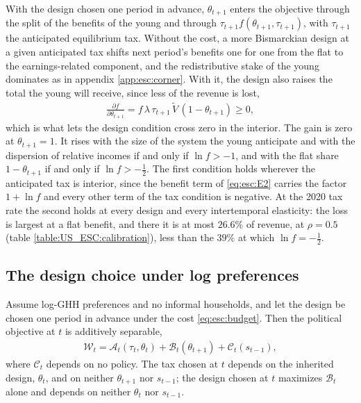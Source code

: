  With the design chosen one period in advance, $\theta_{t+1}$ enters the objective through the split of the benefits of the young and through $\tau_{t+1}f(\theta_{t+1},\tau_{t+1})$, with $\tau_{t+1}$ the anticipated equilibrium tax. Without the cost, a more Bismarckian design at a given anticipated tax shifts next period's benefits one for one from the flat to the earnings-related component, and the redistributive stake of the young dominates as in appendix \ref{app:esc:corner}. With it, the design also raises the total the young will receive, since less of the revenue is lost,
\begin{align}\label{eq:esc:ftheta}
    \frac{\partial f}{\partial \theta_{t+1}} = f\,\lambda\,\tau_{t+1}\,\tilde{V}\,(1-\theta_{t+1}) \geq 0,
\end{align}
which is what lets the design condition cross zero in the interior. The gain is zero at $\theta_{t+1} = 1$. It rises with the size of the system the young anticipate and with the dispersion of relative incomes if and only if $\ln f > -1$, and with the flat share $1-\theta_{t+1}$ if and only if $\ln f > -\frac{1}{2}$. The first condition holds wherever the anticipated tax is interior, since the benefit term of \eqref{eq:esc:E2} carries the factor $1+\ln f$ and every other term of the tax condition is negative. At the 2020 tax rate the second holds at every design and every intertemporal elasticity: the loss is largest at a flat benefit, and there it is at most $26.6\%$ of revenue, at $\rho = 0.5$ (table \ref{table:US_ESC:calibration}), less than the $39\%$ at which $\ln f = -\frac{1}{2}$.

\subsection{The design choice under log preferences}\label{app:esc:log}
\begin{proposition}\label{prop:esc:separability}
Assume log-GHH preferences and no informal households, and let the design be chosen one period in advance under the cost \eqref{eq:esc:budget}. Then the political objective at $t$ is additively separable,
\begin{align}\label{eq:esc:separability}
    \mathcal{W}_t = \mathcal{A}_t\left(\tau_t,\theta_t\right) + \mathcal{B}_t\left(\theta_{t+1}\right) + \mathcal{C}_t\left(s_{t-1}\right),
\end{align}
where $\mathcal{C}_t$ depends on no policy. The tax chosen at $t$ depends on the inherited design, $\theta_t$, and on neither $\theta_{t+1}$ nor $s_{t-1}$; the design chosen at $t$ maximizes $\mathcal{B}_t$ alone and depends on neither $\theta_t$ nor $s_{t-1}$.
\end{proposition}


